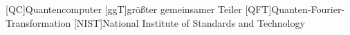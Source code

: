 \begin{acronym}
  [QC]{Quantencomputer}
  [ggT]{größter gemeinsamer Teiler}
  [QFT]{Quanten-Fourier-Transformation}
  [NIST]{National Institute of Standards and Technology}
\end{acronym}